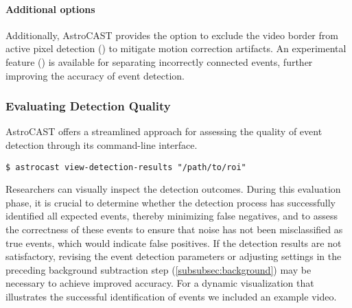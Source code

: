 \paragraph{Additional options}
Additionally, AstroCAST provides the option to exclude the video border from active pixel detection () to mitigate motion correction artifacts. An experimental feature () is available for separating incorrectly connected events, further improving the accuracy of event detection.

\subsubsection{Evaluating Detection Quality}
AstroCAST offers a streamlined approach for assessing the quality of event detection through its command-line interface.

\begin{lstlisting}[style=bashStyle]
    $ astrocast view-detection-results "/path/to/roi"
\end{lstlisting}

Researchers can visually inspect the detection outcomes. During this evaluation phase, it is crucial to determine whether the detection process has successfully identified all expected events, thereby minimizing false negatives, and to assess the correctness of these events to ensure that noise has not been misclassified as true events, which would indicate false positives. If the detection results are not satisfactory, revising the event detection parameters or adjusting settings in the preceding background subtraction step (\ref{subsubsec:background}) may be necessary to achieve improved accuracy. For a dynamic visualization that illustrates the successful identification of events we included an example video.
